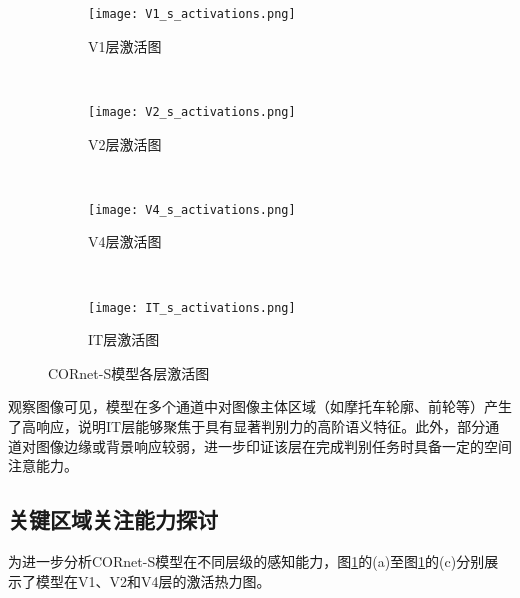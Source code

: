 \begin{figure}[!htb]
	\centering
	\begin{subfigure}[t]{0.8\linewidth}
		\captionsetup{justification=centering}
		\begin{minipage}[b]{1\linewidth}
			\texttt{[image: V1\_s\_activations.png]}
			\caption{V1层激活图}
		\end{minipage}
	\end{subfigure}\\
	\begin{subfigure}[t]{0.8\linewidth}
		\captionsetup{justification=centering}
		\begin{minipage}[b]{1\linewidth}
			\texttt{[image: V2\_s\_activations.png]}
			\caption{V2层激活图}
		\end{minipage}
	\end{subfigure}\\
	\begin{subfigure}[t]{0.8\linewidth}
		\captionsetup{justification=centering}
		\begin{minipage}[b]{1\linewidth}
			\texttt{[image: V4\_s\_activations.png]}
			\caption{V4层激活图}
		\end{minipage}
	\end{subfigure}\\
	\begin{subfigure}[t]{0.8\linewidth}
		\captionsetup{justification=centering}
		\begin{minipage}[b]{1\linewidth}
			\texttt{[image: IT\_s\_activations.png]}
			\caption{IT层激活图}
		\end{minipage}
	\end{subfigure}
	\caption{CORnet-S模型各层激活图}
	\label{f.cornet_s_jihuo}
\end{figure}

观察图像可见，模型在多个通道中对图像主体区域（如摩托车轮廓、前轮等）产生了高响应，说明IT层能够聚焦于具有显著判别力的高阶语义特征。此外，部分通道对图像边缘或背景响应较弱，进一步印证该层在完成判别任务时具备一定的空间注意能力。

\subsection{关键区域关注能力探讨}

为进一步分析CORnet-S模型在不同层级的感知能力，图\ref{f.cornet_s_jihuo}的(a)至图\ref{f.cornet_s_jihuo}的(c)分别展示了模型在V1、V2和V4层的激活热力图。

